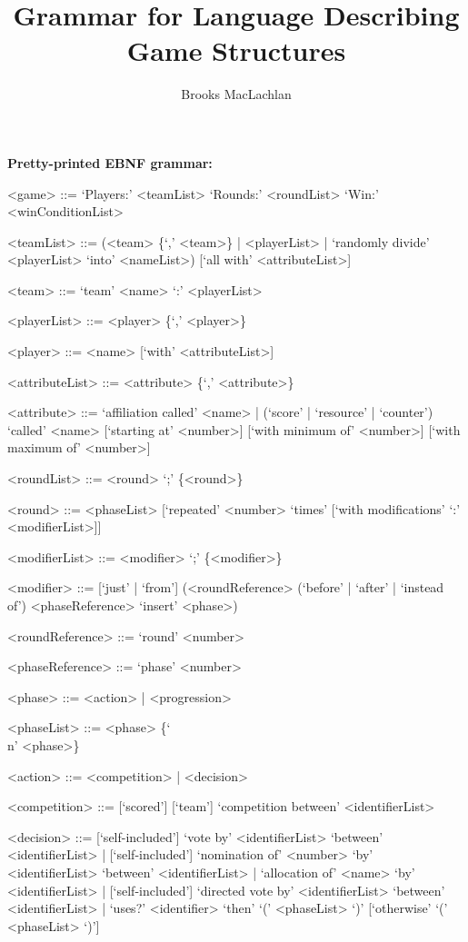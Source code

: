 \documentclass{article}
\title{Grammar for Language Describing Game Structures}
\author{Brooks MacLachlan}
\begin{document}
\maketitle

\noindent \textbf{Pretty-printed EBNF grammar:}
\begin{grammar}
<game> ::= `Players:' <teamList> `Rounds:' <roundList> `Win:' 
<winConditionList>

<teamList> ::= (<team> \{`,' <team>\} | <playerList> | `randomly divide' 
<playerList> `into' <nameList>) [`all with' <attributeList>]

<team> ::= `team' <name> `:' <playerList>

<playerList> ::= <player> \{`,' <player>\}

<player> ::= <name> [`with' <attributeList>]

<attributeList> ::= <attribute> \{`,' <attribute>\}

<attribute> ::= `affiliation called' <name> | (`score' | `resource' | 
`counter') `called'
<name> [`starting at' <number>] [`with minimum of' <number>] [`with maximum of' 
<number>]

<roundList> ::= <round> `;' \{<round>\}

<round> ::= <phaseList> [`repeated' <number> `times' [`with modifications' `:' 
<modifierList>]]

<modifierList> ::= <modifier> `;' \{<modifier>\}

<modifier> ::= [`just' | `from'] (<roundReference> (`before' | `after' | 
`instead of') 
<phaseReference> `insert' <phase>)

<roundReference> ::= `round' <number>

<phaseReference> ::= `phase' <number>

<phase> ::= <action> | <progression>

<phaseList> ::= <phase> \{`\\n' <phase>\}

<action> ::= <competition> | <decision>

<competition> ::= [`scored'] [`team'] `competition between' <identifierList>

<decision> ::= [`self-included'] `vote by' <identifierList> `between' 
<identifierList> | 
[`self-included'] `nomination of' <number> `by' <identifierList> `between' 
<identifierList> | `allocation of' <name> `by' <identifierList> | 
[`self-included'] `directed vote by' <identifierList> `between' 
<identifierList> | `uses?' <identifier> `then' `(' <phaseList> `)' [`otherwise' 
`(' <phaseList> `)']


\end{grammar}
\end{document}
